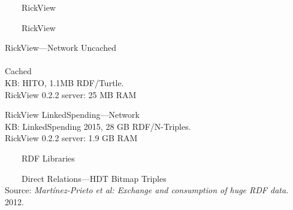 \documentclass[14pt,aspectratio=169]{beamer}
\newcommand{\imageslide}[4][]
{
\begin{frame}[plain]{~~~~#2}
\vspace{0.2em}
\centering\makebox[\linewidth]{\texttt{[image: \#3]}}
\\#1
\note{#4}
\end{frame}
}
\begin{document}
\imageslide{RickView}{img/rickview-screenshot1.png}{}
\imageslide{RickView}{img/rickview-screenshot2.png}{}

\begin{frame}[plain]{RickView---Network}
\centering
Uncached\\
\\
\pause
Cached\\
\centering{}
KB: HITO, 1.1MB RDF/Turtle.\\
RickView 0.2.2 server: 25 MB RAM
\end{frame}

\begin{frame}[plain]{RickView LinkedSpending---Network}
\centering{}\\
\hspace{2em}
\centering{}
KB: LinkedSpending 2015, 28 GB RDF/N-Triples.\\
RickView 0.2.2 server: 1.9 GB RAM
\end{frame}

\imageslide{RDF Libraries}{img/libraries.png}{}

\imageslide[\footnotesize Source: \emph{Martínez-Prieto et al: Exchange and consumption of huge RDF data.} 2012.]{Direct Relations---HDT Bitmap Triples}{img/bt.png}{}
\end{document}
